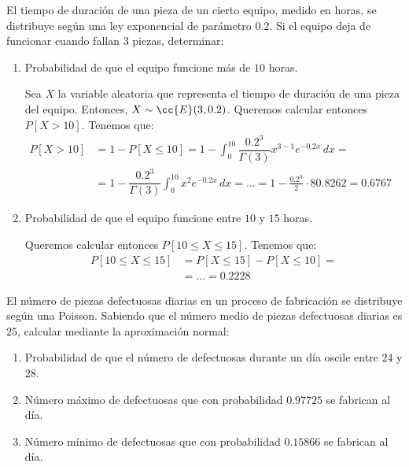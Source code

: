 \begin{ejercicio}
    El tiempo de duración de una pieza de un cierto equipo, medido en horas, se distribuye según una ley exponencial de parámetro $0.2$. 
    Si el equipo deja de funcionar cuando fallan $3$ piezas, determinar:
    \begin{enumerate}
        \item Probabilidad de que el equipo funcione más de $10$ horas.
        
        Sea $X$ la variable aleatoria que representa el tiempo de duración de una pieza del equipo. Entonces, $X\sim \cc{E}(3,0.2)$.
        Queremos calcular entonces $P[X>10]$. Tenemos que:
        \begin{align*}
            P[X>10] &= 1-P[X\leq 10] = 1-\int_{0}^{10} \dfrac{0.2^3}{\Gamma(3)} x^{3-1} e^{-0.2x} \, dx =&\\&= 1-\dfrac{0.2^3}{\Gamma(3)} \int_{0}^{10}x^2 e^{-0.2x} \, dx
            = ... = 1-\frac{0.2^3}{2}\cdot 80.8262 = 0.6767
        \end{align*}
        \item Probabilidad de que el equipo funcione entre $10$ y $15$ horas.
        
        Queremos calcular entonces $P[10\leq X\leq 15]$. Tenemos que:
        \begin{align*}
            P[10\leq X\leq 15] &= P[X\leq 15] - P[X\leq 10] =\\&= ... = 0.2228
        \end{align*}
    \end{enumerate}
\end{ejercicio}

\begin{ejercicio}
    El número de piezas defectuosas diarias en un proceso de fabricación se distribuye según una Poisson. Sabiendo que el número medio de piezas defectuosas diarias es $25$, calcular mediante la aproximación normal:
    \begin{enumerate}
        \item Probabilidad de que el número de defectuosas durante un día oscile entre $24$ y $28$.
        \item Número máximo de defectuosas que con probabilidad $0.97725$ se fabrican al día.
        \item Número mínimo de defectuosas que con probabilidad $0.15866$ se fabrican al día.
    \end{enumerate}
\end{ejercicio}


